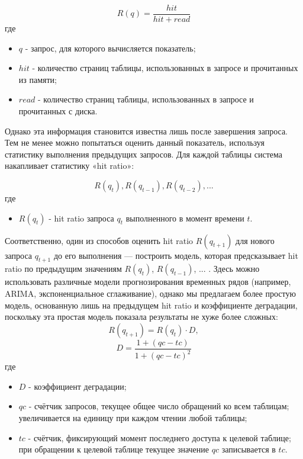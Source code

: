 \begin{equation}
    R(q) = \frac{hit}{hit + read}
\end{equation}
где
\begin{itemize}
    \item \(q\) - запрос, для которого вычисляется показатель;
    \item \(hit\) - количество страниц таблицы, использованных в запросе и прочитанных из памяти;
    \item \(read\) - количество страниц таблицы, использованных в запросе и прочитанных с диска.
\end{itemize}

Однако эта информация становится известна лишь после завершения запроса. Тем не менее можно попытаться оценить данный показатель, используя статистику выполнения предыдущих запросов. Для каждой таблицы система накапливает статистику «hit ratio»:

\begin{equation}
    R(q_{t}), R(q_{t-1}), R(q_{t-2}), ...
\end{equation}
где
\begin{itemize}
    \item \(R(q_{t})\) - hit ratio запроса \(q_{t}\) выполненного в момент времени \(t\).
\end{itemize}

Соответственно, один из способов оценить hit ratio \(R(q_{t+1})\) для нового запроса \(q_{t+1}\) до его выполнения — построить модель, которая предсказывает hit ratio по предыдущим значениям \(R(q_{t})\), \(R(q_{t-1})\), ... . Здесь можно использовать различные модели прогнозирования временных рядов (например, ARIMA, экспоненциальное сглаживание), однако мы предлагаем более простую модель, основанную лишь на предыдущем hit ratio и коэффициенте деградации, поскольку эта простая модель показала результаты не хуже более сложных:
\begin{equation}
    R(q_{t+1}) = R(q_{t}) \cdot D ,
\end{equation}
\begin{equation}
    D = \frac{1 + (qc - tc)}{1 + (qc - tc)^2} 
\end{equation}
где
\begin{itemize}
    \item \(D\) - коэффициент деградации;
    \item \(qc\) - счётчик запросов, текущее общее число обращений ко всем таблицам; увеличивается на единицу при каждом чтении любой таблицы;
    \item \(tc\) - счётчик, фиксирующий момент последнего доступа к целевой таблице; при обращении к целевой таблице текущее значение \(qc\) записывается в \(tc\).    
\end{itemize}

